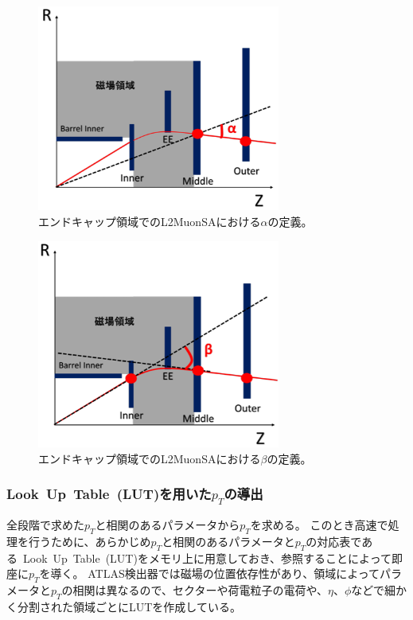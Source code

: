 \begin{figure}[h]
  \centering
  \includegraphics[clip, width=8cm]{fig/3/l2muonSA_alpha.png}
  \caption{エンドキャップ領域でのL2MuonSAにおける$\alpha$の定義\cite{article:noguchi}。}
  \label{fig:3-8}
\end{figure}

\begin{figure}[h]
  \centering
  \includegraphics[clip, width=8cm]{fig/3/l2muonSA_beta.png}
  \caption{エンドキャップ領域でのL2MuonSAにおける$\beta$の定義\cite{article:noguchi}。}
  \label{fig:3-9}
\end{figure}



\subsubsection{Look~Up~Table~(LUT)を用いた$p_T$の導出}
全段階で求めた$p_T$と相関のあるパラメータから$p_T$を求める。
このとき高速で処理を行うために、あらかじめ$p_T$と相関のあるパラメータと$p_T$の対応表である~Look~Up~Table~(LUT)をメモリ上に用意しておき、参照することによって即座に$p_T$を導く。
ATLAS検出器では磁場の位置依存性があり、領域によってパラメータと$p_T$の相関は異なるので、セクターや荷電粒子の電荷や、$\eta$、$\phi$などで細かく分割された領域ごとにLUTを作成している。

